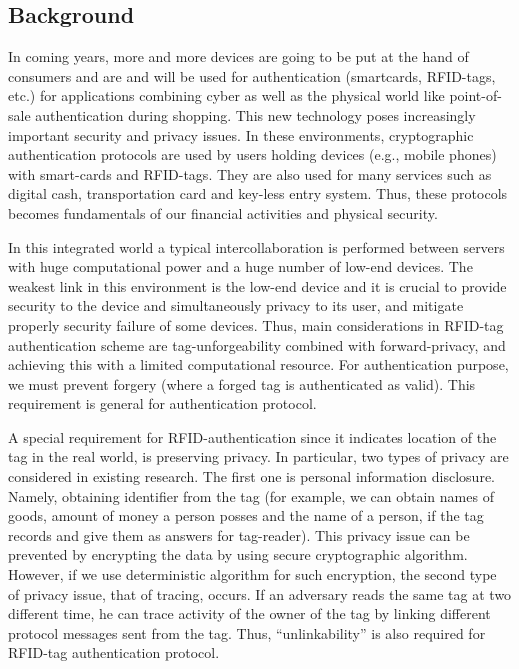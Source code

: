 \documentclass[english]{llncs}
\begin{document}
\subsection{Background}
In coming years, more and more devices are going to be put at the hand
of consumers and are and will be used for authentication (smartcards,
RFID-tags, etc.) for applications combining cyber as well as the
physical world like point-of-sale authentication during shopping.
This new technology poses increasingly important security and privacy
issues.
%
%
In these environments, cryptographic authentication protocols are used
by users holding devices (e.g., mobile phones) with smart-cards and
RFID-tags.  They are also used for many services such as digital cash,
transportation card and key-less entry system. Thus, these protocols
becomes fundamentals of our financial activities and physical
security.

In this integrated world a typical intercollaboration 
is performed
between servers
with huge computational power and a huge number of low-end devices.
The weakest link in this environment is the low-end device 
and it is crucial to provide  security to the 
device  and simultaneously  privacy to its user, and
mitigate properly security failure of some devices.
%
Thus, main considerations in RFID-tag authentication scheme are
tag-unforgeability combined with forward-privacy, and achieving this
with a limited computational resource.
%
For authentication purpose, we must prevent forgery (where a forged
tag is authenticated as valid). This requirement is general for
authentication protocol.  

A special requirement for RFID-authentication
since it indicates location of the tag in the real world, is
preserving privacy. In particular, two types of privacy are considered
in existing research. The first one is personal information
disclosure. Namely, obtaining identifier from the tag (for example, we
can obtain names of goods, amount of money a person posses and the
name of a person, if the tag records and give them as answers for
tag-reader). This privacy issue can be prevented by encrypting the
data by using secure cryptographic algorithm.  However, if we use
deterministic algorithm for such encryption, the second type of
privacy issue, that of tracing, occurs.  If an adversary reads the same
tag at two different time, he can trace activity of the owner of the
tag by linking different protocol messages sent from the tag. Thus,
``unlinkability'' is also required for RFID-tag authentication
protocol.  
\end{document}
